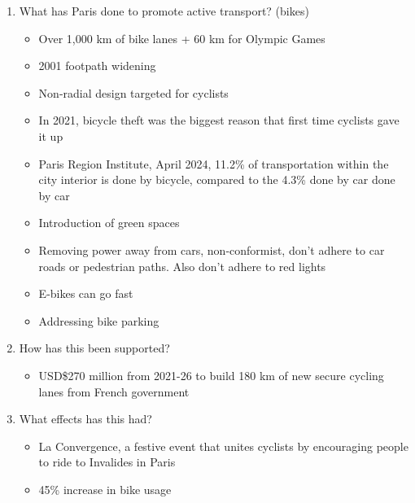 	\begin{enumerate}
		\item What has Paris done to promote active transport? (bikes)
			\begin{itemize}
				\item Over 1,000 km of bike lanes + 60 km for Olympic Games
				\item 2001 footpath widening
				\item Non-radial design targeted for cyclists
				\item In 2021, bicycle theft was the biggest reason that first time cyclists gave it up
				\item Paris Region Institute, April 2024, 11.2\% of transportation within the city interior is done by bicycle, compared to the 4.3\% done by car done by car
				\item Introduction of green spaces
				\item Removing power away from cars, non-conformist, don't adhere to car roads or pedestrian paths. Also don't adhere to red lights
				\item E-bikes can go fast
				\item Addressing bike parking
			\end{itemize}

		\item How has this been supported?
			\begin{itemize}
				\item USD\$270 million from 2021-26 to build 180 km of new secure cycling lanes from French government
			\end{itemize}

		\item What effects has this had?
			\begin{itemize}
				\item La Convergence, a festive event that unites cyclists by encouraging people to ride to Invalides in Paris
				\item 45\% increase in bike usage
			\end{itemize}
	\end{enumerate}
